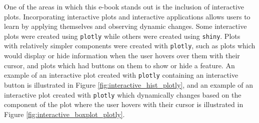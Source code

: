 \documentclass[11pt]{article}
\begin{document}
%
%


One of the areas in which this e-book stands out is the inclusion of interactive plots.
Incorporating interactive plots and interactive applications allows users to learn by applying themselves and observing dynamic changes.
Some interactive plots were created using \texttt{plotly} while others were created using \texttt{shiny}. 
Plots with relatively simpler components were created with \texttt{plotly}, 
such as plots which would display or hide information when the user hovers over them with their cursor,
and plots which had buttons on them to show or hide a feature.
An example of an interactive plot created with \texttt{plotly} containing an interactive button is illustrated in Figure \ref{fig:interactive_hist_plotly},
and an example of an interactive plot created with \texttt{plotly} which dynamically changes based on the component of the plot where the user hovers with their cursor is illustrated in Figure \ref{fig:interactive_boxplot_plotly}.
\end{document}
